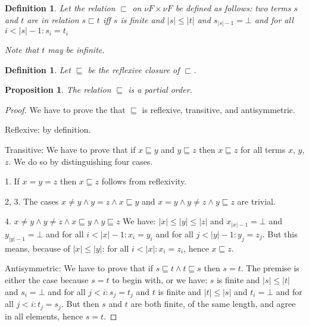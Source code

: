 \documentclass[a4paper]{article}
\newtheorem{defStrictOrderNuF}[defNuF]{Definition}
\newtheorem{defPartialOrderNuF}[defNuF]{Definition}
\newtheorem{thmPONuFisPartial}[defNuF]{Proposition}
\begin{document}
\begin{defStrictOrderNuF}

Let the relation $\sqsubset$ on $\nu F \times \nu F$ be defined as follows: two
terms $s$ and $t$ are in relation $s \sqsubset t$ iff $s$ is finite and $|s|
\leq |t|$ and $s_{|s|-1} = \bot$ and for all $i < |s|-1: s_i = t_i$

Note that $t$ may be infinite.

\end{defStrictOrderNuF}


\begin{defPartialOrderNuF}

Let $\sqsubseteq$ be the reflexive closure of $\sqsubset$.

\end{defPartialOrderNuF}


\begin{thmPONuFisPartial}

The relation $\sqsubseteq$ is a partial order.

\end{thmPONuFisPartial}


\begin{proof}

We have to prove the that $\sqsubseteq$ is reflexive, transitive, and
antisymmetric.

Reflexive: by definition.

Transitive: We have to prove that if $x \sqsubseteq y$ and $y \sqsubseteq z$
then $x \sqsubseteq z$ for all terms $x$, $y$, $z$. We do so by distinguishing
four cases.

1. If $x = y = z$ then $x \sqsubseteq z$ follows from reflexivity.

2, 3. The cases $x \neq y \wedge y = z \wedge x \sqsubseteq y$ and $x = y
\wedge y \neq z \wedge y \sqsubseteq z$ are trivial.

4. $x \neq y \wedge y \neq z \wedge x \sqsubseteq y \wedge y \sqsubseteq z$ We
have: $|x| \leq |y| \leq |z|$ and $x_{|x|-1} = \bot$ and $y_{|y|-1} = \bot$ and
for all $i < |x|-1: x_i = y_i$ and for all $j < |y|-1: y_j = z_j$.  But this
means, because of $|x| \leq |y|$: for all $i < |x|: x_i = z_i$, hence $x
\sqsubseteq z$.

Antisymmetric: We have to prove that if $s \sqsubseteq t \wedge t \sqsubseteq
s$ then $s = t$.  The premise is either the case because $s = t$ to begin with,
or we have: $s$ is finite and $|s| \leq |t|$ and $s_i = \bot$ and for all $j <
i: s_j = t_j$ and $t$ is finite and $|t| \leq |s|$ and $t_i = \bot$ and for all
$j < i: t_j = s_j$.  But then $s$ and $t$ are both finite, of the same length,
and agree in all elements, hence $s = t$.

\end{proof}
\end{document}
